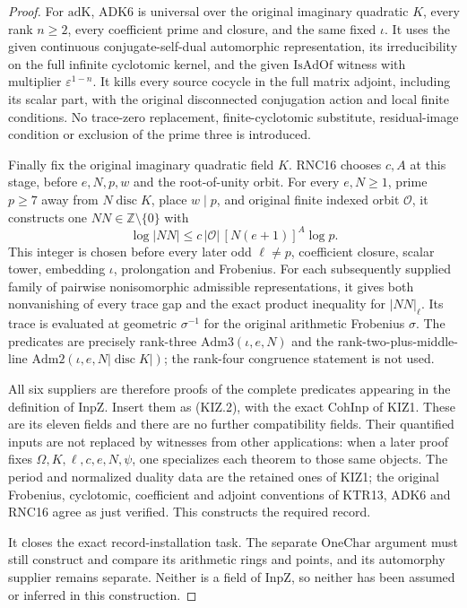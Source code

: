 \documentclass[11pt,a4paper]{article}
\numberwithin{equation}{section}
\theoremstyle{remark}\newtheorem{remark}[theorem]{Remark}
\begin{document}
\begin{proof}
For \(\mathrm{adK}\), ADK6 is universal over the original
imaginary quadratic \(K\), every rank \(n\ge2\), every
coefficient prime and closure, and the same fixed \(\iota\).
It uses the given continuous conjugate-self-dual automorphic
representation, its irreducibility on the full infinite cyclotomic
kernel, and the given \(\mathrm{IsAdOf}\) witness with multiplier
\(\varepsilon^{1-n}\).  It kills every source cocycle in the
full matrix adjoint, including its scalar part, with the original
disconnected conjugation action and local finite conditions.  No
trace-zero replacement, finite-cyclotomic substitute, residual-image
condition or exclusion of the prime three is introduced.

Finally fix the original imaginary quadratic field \(K\).
RNC16 chooses \(c,A\) at this stage, before \(e,N,p,w\)
and the root-of-unity orbit.  For every \(e,N\ge1\), prime
\(p\ge7\) away from \(N\operatorname{disc}K\), place
\(w\mid p\), and original finite indexed orbit \(\mathcal O\),
it constructs one \(NN\in\mathbb Z\setminus\{0\}\) with
\[
 \log|NN|\le c\,|\mathcal O|\,[N(e+1)]^A\log p.
 \tag{KIZ.6}
\]
This integer is chosen before every later odd \(\ell\ne p\),
coefficient closure, scalar tower, embedding \(\iota\),
prolongation and Frobenius.  For each subsequently supplied family
of pairwise nonisomorphic admissible representations, it gives both
nonvanishing of every trace gap and the exact product inequality
for \(|NN|_\ell\).  Its trace is evaluated at geometric
\(\sigma^{-1}\) for the original arithmetic Frobenius \(\sigma\).
The predicates are precisely rank-three \(\mathrm{Adm3}(\iota,e,N)\)
and the rank-two-plus-middle-line
\(\mathrm{Adm2}(\iota,e,N|\operatorname{disc}K|)\); the
rank-four congruence statement is not used.

All six suppliers are therefore proofs of the complete predicates
appearing in the definition of \(\mathrm{InpZ}\).  Insert them
as (KIZ.2), with the exact \(\mathrm{CohInp}\) of KIZ1.
These are its eleven fields and there are no further compatibility
fields.  Their quantified inputs are not replaced by witnesses from
other applications: when a later proof fixes \(\Omega,K,\ell,c,
e,N,\psi\), one specializes each theorem to those same objects.
The period and normalized duality data are the retained ones of
KIZ1; the original Frobenius, cyclotomic, coefficient and adjoint
conventions of KTR13, ADK6 and RNC16 agree as just verified.
This constructs the required record.

It closes the exact record-installation task.  The separate
\(\mathrm{OneChar}\) argument must still construct and compare
its arithmetic rings and points, and its automorphy supplier remains
separate.  Neither is a field of \(\mathrm{InpZ}\), so neither
has been assumed or inferred in this construction.
\end{proof}
\end{document}
